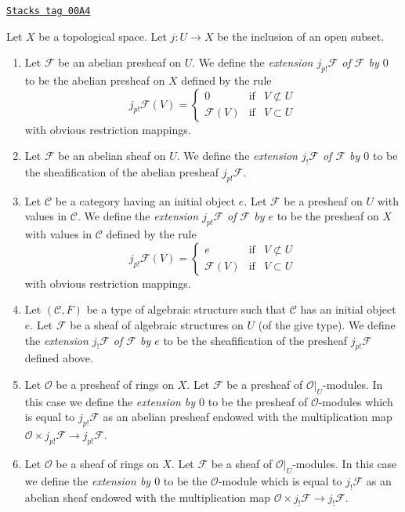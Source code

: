 \begin{definition}
\label{sheaves-definition-j-shriek-structures}
\href{https://stacks.math.columbia.edu/tag/00A4}{\texttt{Stacks tag 00A4}}

Let $X$ be a topological space.
Let $j : U \to X$ be the inclusion of an open subset.
\begin{enumerate}
\item Let $\mathcal{F}$ be an abelian presheaf on $U$.
We define the {\it extension $j_{p!}\mathcal{F}$ of $\mathcal{F}$ by $0$}
to be the abelian presheaf on $X$ defined by the rule
$$
j_{p!}\mathcal{F}(V) =
\left\{
\begin{matrix}
0 & \text{if} & V \not \subset U \\
\mathcal{F}(V) & \text{if} & V \subset U
\end{matrix}
\right.
$$
with obvious restriction mappings.
\item Let $\mathcal{F}$ be an abelian sheaf on $U$. We define
the {\it extension $j_!\mathcal{F}$ of $\mathcal{F}$ by $0$}
to be the sheafification of the abelian presheaf $j_{p!}\mathcal{F}$.
\item Let $\mathcal{C}$ be a category having an initial object $e$.
Let $\mathcal{F}$ be a presheaf on $U$ with values in $\mathcal{C}$.
We define the {\it extension $j_{p!}\mathcal{F}$ of $\mathcal{F}$ by $e$}
to be the presheaf on $X$ with values in $\mathcal{C}$ defined by the
rule
$$
j_{p!}\mathcal{F}(V) =
\left\{
\begin{matrix}
e & \text{if} & V \not \subset U \\
\mathcal{F}(V) & \text{if} & V \subset U
\end{matrix}
\right.
$$
with obvious restriction mappings.
\item Let $(\mathcal{C}, F)$ be a type of algebraic structure
such that $\mathcal{C}$ has an initial object $e$.
Let $\mathcal{F}$ be a sheaf of algebraic structures on $U$
(of the give type). We define the
{\it extension $j_!\mathcal{F}$ of $\mathcal{F}$ by $e$}
to be the sheafification of the presheaf $j_{p!}\mathcal{F}$
defined above.
\item Let $\mathcal{O}$ be a presheaf of rings on $X$.
Let $\mathcal{F}$ be a presheaf of $\mathcal{O}|_U$-modules.
In this case we define the {\it extension by $0$}
to be the presheaf of $\mathcal{O}$-modules which is equal to
$j_{p!}\mathcal{F}$ as an abelian presheaf endowed with
the multiplication map
$\mathcal{O} \times j_{p!}\mathcal{F} \to j_{p!}\mathcal{F}$.
\item Let $\mathcal{O}$ be a sheaf of rings on $X$.
Let $\mathcal{F}$ be a sheaf of $\mathcal{O}|_U$-modules.
In this case we define the {\it extension by $0$}
to be the $\mathcal{O}$-module which is equal to
$j_!\mathcal{F}$ as an abelian sheaf endowed with
the multiplication map $\mathcal{O} \times j_!\mathcal{F} \to j_!\mathcal{F}$.
\end{enumerate}
\end{definition}

